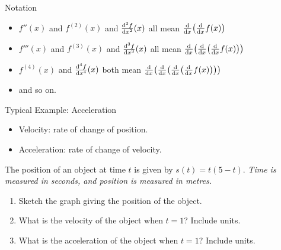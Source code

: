 \begin{frame}[t]
\begin{block}{Notation~}
\begin{itemize}
\item $f''(x)$ and $f^{(2)}(x)$  and $\frac{\mathrm{d}^2f}{\mathrm{d}{x}^2}(x)$ all mean
$\frac{\text{d}}{\text{d}x}\big(\frac{\text{d}}{\text{d}x}f(x)\big)$
\item $f'''(x)$ and $f^{(3)}(x)$  and $\frac{\mathrm{d}^3f}{\mathrm{d}{x}^3}(x)$ all mean
$\frac{\text{d}}{\text{d}x}\big(\frac{\text{d}}{\text{d}x}\big(\frac{\text{d}}{\text{d}x}f(x)\big)\big)$
\item $f^{(4)}(x)$  and $\frac{\mathrm{d}^4f}{\mathrm{d}{x}^4}(x)$ both mean
$\frac{\text{d}}{\text{d}x}\big(\frac{\text{d}}{\text{d}x}\big(\frac{\text{d}}{\text{d}x}\big(\frac{\text{d}}{\text{d}x}f(x)\big)\big)\big)$
\item and so on.
\end{itemize}
\end{block}
\end{frame}
\begin{frame}[t]{Typical Example: Acceleration}
\begin{itemize}
\item Velocity: rate of change of position.\pause
\item Acceleration: rate of change of velocity.
\end{itemize}
\pause
The position of an object at time $t$ is given by $s(t) = t(5-t)$. \textit{Time is measured in seconds, and position is measured in metres.}
\begin{enumerate}
\item Sketch the graph giving the position of the object.
\item What is the velocity of the object when $t=1$? Include units.
\item What is the acceleration of the object when $t=1$? Include units.
\end{enumerate}

\color{answercolor}
\end{frame}
